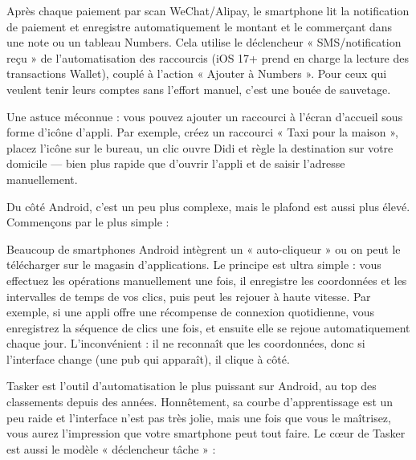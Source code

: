 
Après chaque paiement par scan WeChat/Alipay, le smartphone lit la notification de paiement et enregistre automatiquement le montant et le commerçant dans une note ou un tableau Numbers. Cela utilise le déclencheur « SMS/notification reçu » de l'automatisation des raccourcis (iOS 17+ prend en charge la lecture des transactions Wallet), couplé à l'action « Ajouter à Numbers ». Pour ceux qui veulent tenir leurs comptes sans l'effort manuel, c'est une bouée de sauvetage.

Une astuce méconnue : vous pouvez ajouter un raccourci à l'écran d'accueil sous forme d'icône d'appli. Par exemple, créez un raccourci « Taxi pour la maison », placez l'icône sur le bureau, un clic ouvre Didi et règle la destination sur votre domicile — bien plus rapide que d'ouvrir l'appli et de saisir l'adresse manuellement.


Du côté Android, c'est un peu plus complexe, mais le plafond est aussi plus élevé. Commençons par le plus simple :


Beaucoup de smartphones Android intègrent un « auto-cliqueur » ou on peut le télécharger sur le magasin d'applications. Le principe est ultra simple : vous effectuez les opérations manuellement une fois, il enregistre les coordonnées et les intervalles de temps de vos clics, puis peut les rejouer à haute vitesse. Par exemple, si une appli offre une récompense de connexion quotidienne, vous enregistrez la séquence de clics une fois, et ensuite elle se rejoue automatiquement chaque jour. L'inconvénient : il ne reconnaît que les coordonnées, donc si l'interface change (une pub qui apparaît), il clique à côté.


Tasker est l'outil d'automatisation le plus puissant sur Android, au top des classements depuis des années. Honnêtement, sa courbe d'apprentissage est un peu raide et l'interface n'est pas très jolie, mais une fois que vous le maîtrisez, vous aurez l'impression que votre smartphone peut tout faire. Le cœur de Tasker est aussi le modèle « déclencheur tâche » :

